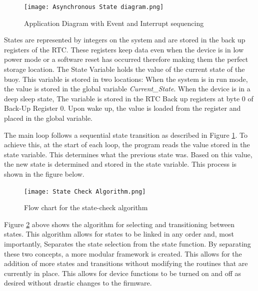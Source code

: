 \begin{figure}[H]
    \centering
    \texttt{[image: Asynchronous State diagram.png]}
    \caption{Application Diagram with Event and Interrupt sequencing}
    \label{fig:main software}
\end{figure}

States are represented by integers on the system and are stored in the back up registers of the RTC. These registers keep data even when the device is in low power mode or a software reset has occurred therefore making them the perfect storage location. The State Variable holds the value of the current state of the buoy. This variable is stored in two locations: When the system is in run mode, the value is stored in the global variable \textit{Current\_State}. When the device is in a deep sleep state, The variable is stored in the RTC Back up registers at byte 0 of Back-Up Register 0. Upon wake up, the value is loaded from the register and placed in the global variable.

The main loop follows a sequential state transition as described in Figure \ref{fig:main software}. To achieve this, at the start of each loop, the program reads the value stored in the state variable. This determines what the previous state was. Based on this value, the new state is determined and stored in the state variable. This process is shown in the figure below.

\begin{figure}[H]
    \centering
    \texttt{[image: State Check Algorithm.png]}
    \caption{Flow chart for the state-check algorithm}
    \label{fig:state_check}
\end{figure}

Figure \ref{fig:state_check} above shows the algorithm for selecting and transitioning between states. This algorithm allows for states to be linked in any order and, most importantly, Separates the state selection from the state function. By separating these two concepts, a more modular framework is created. This allows for the addition of more states and transitions without modifying the routines that are currently in place. This allows for device functions to be turned on and off as desired without drastic changes to the firmware.

